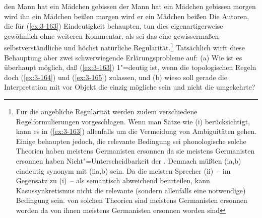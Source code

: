 \documentclass[output=paper]{langsci/langscibook}
\begin{document}
\eal
\label{ex:3-164}
\ex
\label{ex:3-164a}
den Mann hat ein Mädchen gebissen
\ex
\label{ex:3-164b}
der Mann hat ein Mädchen gebissen
\zl
\eal
\label{ex:3-165}
\ex
\label{ex:3-165a}
morgen wird ihn ein Mädchen beißen
\ex
\label{ex:3-165b}
morgen wird er ein Mädchen beißen
\zl
\addlines[2]\enlargethispage{6pt}%
Die Autoren, die für (\ref{ex:3-163}) Eindeutigkeit behaupten, tun dies
eigenartigerweise gewöhnlich ohne weiteren Kommentar, als sei das eine
gewissermaßen selbstverständliche und höchst natürliche
Regularität.\footnote{\label{fn:3-30}%
	Für die angebliche Regularität werden zudem verschiedene
  Regelformulierungen vorgeschlagen. Wenn man Sätze wie (i)
  berücksichtigt, kann es in (\ref{ex:3-163}) allenfalls um die Vermeidung von
  Ambiguitäten gehen. Einige behaupten jedoch, die relevante Bedingung
  sei phonologische
  \eal
  \label{ex:3-fn30i}
  \ex
  \label{ex:3-fn30ia}
  solche Theorien haben meistens Germanisten ersonnen
  \ex
  \label{ex:3-fn30ib}
  da sie meistens Germanisten ersonnen haben
  \zl
  Nicht"=Unterscheidbarkeit der . Demnach müßten (ia,b) eindeutig
  synonym mit (iia,b) sein. Da die meisten Sprecher (ii)~-- im
  Gegensatz zu (i)~-- als semantisch abweichend beurteilen, kann
  Kasussynkretismus nicht die relevante (sondern allenfalls eine
  notwendige) Bedingung sein.
  \eal
  \label{ex:3-fn30ii}
  \ex
  \label{ex:3-fn30iia}
  von solchen Theorien sind meistens Germanisten ersonnen worden
  \ex
  \label{ex:3-fn30iib}
  da von ihnen meistens Germanisten ersonnen worden sind
  \zllast%
}
Tatsächlich wirft diese Behauptung aber zwei
schwerwiegende Erlärungsprobleme auf: (a) Wie ist es überhaupt
möglich, daß (\ref{ex:3-163}) 1"=deutig ist, wenn die topologischen Regeln doch
(\ref{ex:3-164}) und (\ref{ex:3-165}) zulassen, und (b) wieso soll gerade die Interpretation
mit  vor Objekt die einzig mögliche sein und nicht die
umgekehrte?
\end{document}
